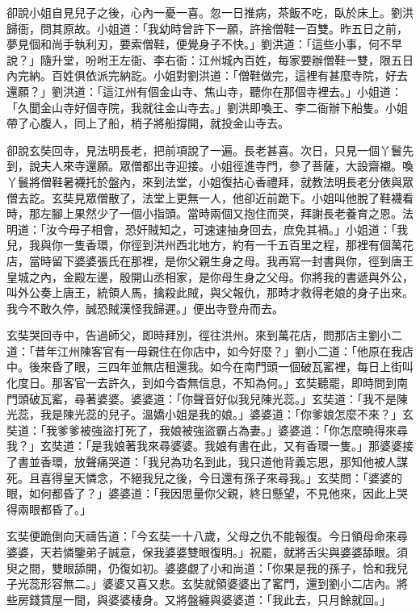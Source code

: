卻說小姐自見兒子之後，心內一憂一喜。忽一日推病，茶飯不吃，臥於床上。劉洪歸衙，問其原故。小姐道：「我幼時曾許下一願，許捨僧鞋一百雙。昨五日之前，夢見個和尚手執利刃，要索僧鞋，便覺身子不快。」劉洪道：「這些小事，何不早說？」隨升堂，吩咐王左衙、李右衙：江州城內百姓，每家要辦僧鞋一雙，限五日內完納。百姓俱依派完納訖。小姐對劉洪道：「僧鞋做完，這裡有甚麼寺院，好去還願？」劉洪道：「這江州有個金山寺、焦山寺，聽你在那個寺裡去。」小姐道：「久聞金山寺好個寺院，我就往金山寺去。」劉洪即喚王、李二衙辦下船隻。小姐帶了心腹人，同上了船，梢子將船撐開，就投金山寺去。

卻說玄奘回寺，見法明長老，把前項說了一遍。長老甚喜。次日，只見一個丫鬟先到，說夫人來寺還願。眾僧都出寺迎接。小姐徑進寺門，參了菩薩，大設齋襯。喚丫鬟將僧鞋暑襪托於盤內，來到法堂，小姐復拈心香禮拜，就教法明長老分俵與眾僧去訖。玄奘見眾僧散了，法堂上更無一人，他卻近前跪下。小姐叫他脫了鞋襪看時，那左腳上果然少了一個小指頭。當時兩個又抱住而哭，拜謝長老養育之恩。法明道：「汝今母子相會，恐奸賊知之，可速速抽身回去，庶免其禍。」小姐道：「我兒，我與你一隻香環，你徑到洪州西北地方，約有一千五百里之程，那裡有個萬花店，當時留下婆婆張氏在那裡，是你父親生身之母。我再寫一封書與你，徑到唐王皇城之內，金殿左邊，殷開山丞相家，是你母生身之父母。你將我的書遞與外公，叫外公奏上唐王，統領人馬，擒殺此賊，與父報仇，那時才救得老娘的身子出來。我今不敢久停，誠恐賊漢怪我歸遲。」便出寺登舟而去。

玄奘哭回寺中，告過師父，即時拜別，徑往洪州。來到萬花店，問那店主劉小二道：「昔年江州陳客官有一母親住在你店中，如今好麼？」劉小二道：「他原在我店中。後來昏了眼，三四年並無店租還我。如今在南門頭一個破瓦窰裡，每日上街叫化度日。那客官一去許久，到如今杳無信息，不知為何。」玄奘聽罷，即時問到南門頭破瓦窰，尋著婆婆。婆婆道：「你聲音好似我兒陳光蕊。」玄奘道：「我不是陳光蕊，我是陳光蕊的兒子。溫嬌小姐是我的娘。」婆婆道：「你爹娘怎麼不來？」玄奘道：「我爹爹被強盜打死了，我娘被強盜霸占為妻。」婆婆道：「你怎麼曉得來尋我？」玄奘道：「是我娘著我來尋婆婆。我娘有書在此，又有香環一隻。」那婆婆接了書並香環，放聲痛哭道：「我兒為功名到此，我只道他背義忘恩，那知他被人謀死。且喜得皇天憐念，不絕我兒之後，今日還有孫子來尋我。」玄奘問：「婆婆的眼，如何都昏了？」婆婆道：「我因思量你父親，終日懸望，不見他來，因此上哭得兩眼都昏了。」

玄奘便跪倒向天禱告道：「今玄奘一十八歲，父母之仇不能報復。今日領母命來尋婆婆，天若憐鑒弟子誠意，保我婆婆雙眼復明。」祝罷，就將舌尖與婆婆舔眼。須臾之間，雙眼舔開，仍復如初。婆婆覷了小和尚道：「你果是我的孫子，恰和我兒子光蕊形容無二。」婆婆又喜又悲。玄奘就領婆婆出了窰門，還到劉小二店內。將些房錢賃屋一間，與婆婆棲身。又將盤纏與婆婆道：「我此去，只月餘就回。」

